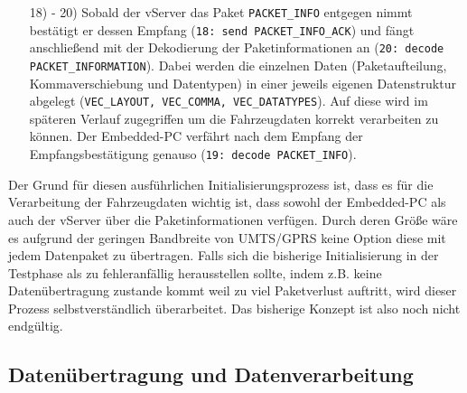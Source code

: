 \documentclass[fontsize = 12pt, paper = a4]{scrreprt}
\begin{document}
\begin{itemize}
\item[18) - 20)]
Sobald der vServer das Paket \texttt{PACKET\_INFO} entgegen nimmt bestätigt er dessen Empfang (\texttt{18: send PACKET\_INFO\_ACK}) und fängt anschließend mit der Dekodierung der Paketinformationen an (\texttt{20: decode PACKET\_INFORMATION}). Dabei werden die einzelnen Daten (Paketaufteilung, Kommaverschiebung und Datentypen) in einer jeweils eigenen Datenstruktur abgelegt (\texttt{VEC\_LAYOUT, VEC\_COMMA, VEC\_DATATYPES}). Auf diese wird im späteren Verlauf zugegriffen um die Fahrzeugdaten korrekt verarbeiten zu können. Der Embedded-PC verfährt nach dem Empfang der Empfangsbestätigung genauso (\texttt{19: decode PACKET\_INFO}).

\end{itemize}

Der Grund für diesen ausführlichen Initialisierungsprozess ist, dass es für die Verarbeitung der Fahrzeugdaten wichtig ist, dass sowohl der Embedded-PC als auch der vServer über die Paketinformationen verfügen. Durch deren Größe wäre es aufgrund der geringen Bandbreite von UMTS/GPRS keine Option diese mit jedem Datenpaket zu übertragen. Falls sich die bisherige Initialisierung in der Testphase als zu fehleranfällig herausstellen sollte, indem z.B. keine Datenübertragung zustande kommt weil zu viel Paketverlust auftritt, wird dieser Prozess selbstverständlich überarbeitet. Das bisherige Konzept ist also noch nicht endgültig.

\subsection{Datenübertragung und Datenverarbeitung}
\end{document}
